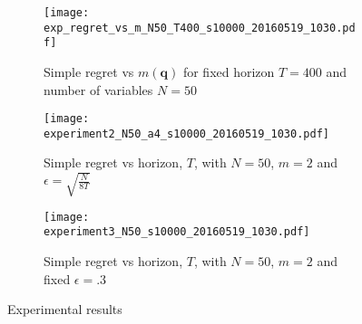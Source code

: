 \begin{figure}
    \begin{subfigure}[t]{0.3\textwidth}
		\centering    
    		\texttt{[image: exp\_regret\_vs\_m\_N50\_T400\_s10000\_20160519\_1030.pdf]}
    		\caption{Simple regret vs $m(\boldsymbol{q})$ for fixed horizon $T=400$ and number of variables $N = 50$}
        \label{fig:simple_vs_m}
    \end{subfigure}\hfill
    \begin{subfigure}[t]{0.3\textwidth}
    		\centering
        \texttt{[image: experiment2\_N50\_a4\_s10000\_20160519\_1030.pdf]}
    		\caption{Simple regret vs horizon, $T$, with $N = 50$, $m=2$ and $\epsilon = \sqrt{\frac{N}{8T}}$}
        \label{fig:simple_vs_T_vary_epsilon}
    \end{subfigure}\hfill
    \begin{subfigure}[t]{0.3\textwidth}
    		\centering
    		\texttt{[image: experiment3\_N50\_s10000\_20160519\_1030.pdf]}
    		\caption{Simple regret vs horizon, $T$, with $N = 50$, $m=2$ and fixed $\epsilon = .3$}
    		\label{fig:simple_vs_T}
    \end{subfigure}
    \caption{Experimental results}
    \label{fig:experiments}
\end{figure}




